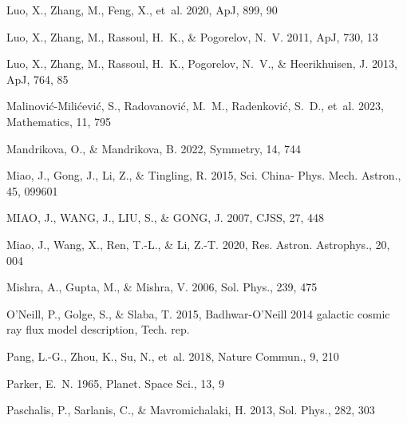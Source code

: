 \documentclass[twocolumn,,12pt]{aastex631}
\begin{document}
\begin{thebibliography}{99}
Luo, X., Zhang, M., Feng, X., {et~al.} 2020, ApJ, 899, 90

Luo, X., Zhang, M., Rassoul, H.~K., \& Pogorelov, N.~V. 2011, ApJ, 730, 13

Luo, X., Zhang, M., Rassoul, H.~K., Pogorelov, N.~V., \& Heerikhuisen, J. 2013,
  ApJ, 764, 85

Malinovi{\'c}-Mili{\'c}evi{\'c}, S., Radovanovi{\'c}, M.~M., Radenkovi{\'c},
  S.~D., {et~al.} 2023, Mathematics, 11, 795

Mandrikova, O., \& Mandrikova, B. 2022, Symmetry, 14, 744

Miao, J., Gong, J., Li, Z., \& Tingling, R. 2015, Sci. China- Phys. Mech.
  Astron., 45, 099601

MIAO, J., WANG, J., LIU, S., \& GONG, J. 2007, CJSS, 27, 448

Miao, J., Wang, X., Ren, T.-L., \& Li, Z.-T. 2020, Res. Astron. Astrophys., 20,
  004

Mishra, A., Gupta, M., \& Mishra, V. 2006, Sol. Phys., 239, 475

O'Neill, P., Golge, S., \& Slaba, T. 2015, Badhwar-O'Neill 2014 galactic cosmic
  ray flux model description, Tech. rep.

Pang, L.-G., Zhou, K., Su, N., {et~al.} 2018, Nature Commun., 9, 210

Parker, E.~N. 1965, Planet. Space Sci., 13, 9

Paschalis, P., Sarlanis, C., \& Mavromichalaki, H. 2013, Sol. Phys., 282, 303


\end{thebibliography}
\end{document}
